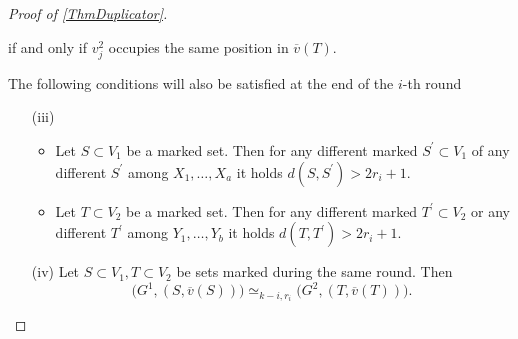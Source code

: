 \documentclass[12pt,notitlepage,a4paper]{article}
\theoremstyle{definition}
\begin{document}
\begin{proof}[Proof of \cref{ThmDuplicator}]
\begin{itemize}
		if and only if $v^2_j$ occupies the same position 
		in $\overline{v}(T)$.
	\end{itemize}
	The following conditions will also be satisfied at the 
	end of the $i$-th round
	\begin{itemize}
		\item[(iii)] 
			\begin{itemize}
			\item  Let $S\subset V_1$ be a marked set. Then 
			for any different marked $S^\prime \subset V_1$ 
			of any different $S^\prime$ among $X_1,\dots,X_a$
			it holds $d(S,S^\prime)>2r_i + 1$. 
			\item Let $T\subset V_2$ be a marked set. Then
			for any different marked $T^\prime \subset V_2$
			or any different $T^\prime$ among
			$Y_1,\dots, Y_b$  it holds $d(T,T^\prime)>2r_i +1$.
			\end{itemize}
		\item[(iv)] Let $S\subset V_1, T\subset V_2$ be sets
		marked during the same round. Then
		\[
		\big(G^1, (S,\overline{v}(S))\big)\simeq_{k-i,r_i}
		\big(G^2, (T,\overline{v}(T))\big).	\]
					

\end{itemize}
\end{proof}
\end{document}
